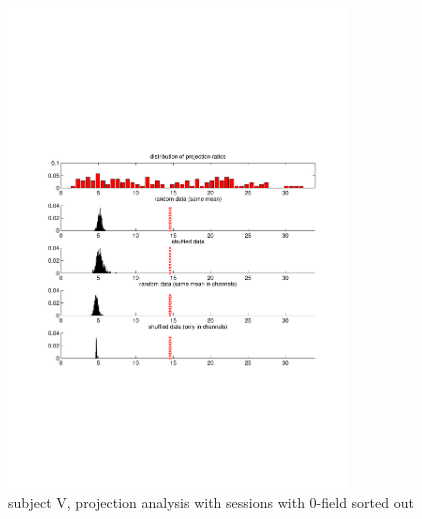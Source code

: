 \begin{figure}[ht]
    \centering
        \includegraphics[width=0.8\textwidth]{images/projection_larger0_vega.pdf}
        \caption{subject V, projection analysis with sessions with 0-field sorted out}
    \label{sg:fig:images_projection_larger0_vega}
\end{figure}


